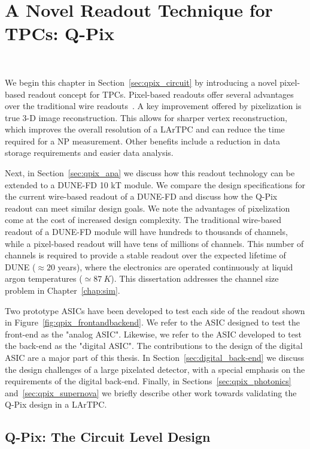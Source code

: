 \chapter{A Novel Readout Technique for TPCs: Q-Pix}~\label{chap:qpix}

We begin this chapter in Section~\ref{sec:qpix_circuit} by introducing a novel pixel-based readout concept for TPCs.
Pixel-based readouts offer several advantages over the traditional wire readouts~\citep{lartpc_recon_problems_joshi_2015}.
A key improvement offered by pixelization is true 3-D image reconstruction.
This allows for sharper vertex reconstruction, which improves the overall resolution of a LArTPC and can reduce the time required for a NP measurement.
Other benefits include a reduction in data storage requirements and easier data analysis.

Next, in Section~\ref{sec:qpix_apa} we discuss how this readout technology can be extended to a DUNE-FD 10 kT module.
We compare the design specifications for the current wire-based readout of a DUNE-FD and discuss how the Q-Pix readout can meet similar design goals.
We note the advantages of pixelization come at the cost of increased design complexity.
The traditional wire-based readout of a DUNE-FD module will have hundreds to thousands of channels, while a pixel-based readout will have tens of millions of channels.
This number of channels is required to provide a stable readout over the expected lifetime of DUNE ($\approx 20$ years), where the electronics are operated continuously at liquid argon temperatures ($\simeq 87~\unit{K}$).
This dissertation addresses the channel size problem in Chapter~\ref{chap:sim}.

Two prototype ASICs have been developed to test each side of the readout shown in Figure~\ref{fig:qpix_frontandbackend}.
We refer to the ASIC designed to test the front-end as the "analog ASIC".
Likewise, we refer to the ASIC developed to test the back-end as the "digital ASIC".
The contributions to the design of the digital ASIC are a major part of this thesis.
In Section~\ref{sec:digital_back-end} we discuss the design challenges of a large pixelated detector, with a special emphasis on the requirements of the digital back-end.
Finally, in Sections~\ref{sec:qpix_photonics} and~\ref{sec:qpix_supernova} we briefly describe other work towards validating the Q-Pix design in a LArTPC.

\section{Q-Pix: The Circuit Level Design}~\label{sec:qpix_circuit}

